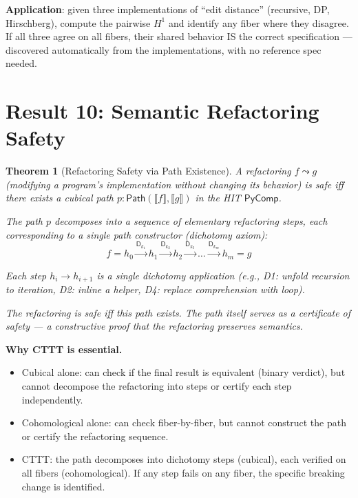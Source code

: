 \documentclass[11pt,a4paper]{report}
\theoremstyle{definition}
\theoremstyle{plain}
\newtheorem{theorem}[definition]{Theorem}
\newcommand{\den}[1]{\llbracket #1 \rrbracket}
\newcommand{\Path}{\mathsf{Path}}
\newcommand{\Hone}{H^1}
\begin{document}
\textbf{Application}: given three implementations of ``edit distance''
(recursive, DP, Hirschberg), compute the pairwise $\Hone$ and
identify any fiber where they disagree.  If all three agree on all
fibers, their shared behavior IS the correct specification ---
discovered automatically from the implementations, with no reference
spec needed.

\section{Result 10: Semantic Refactoring Safety}

\begin{theorem}[Refactoring Safety via Path Existence]
\label{thm:refactor}
A refactoring $f \leadsto g$ (modifying a program's implementation
without changing its behavior) is \emph{safe} iff there exists a
cubical path $p : \Path(\den{f}, \den{g})$ in the HIT
$\mathsf{PyComp}$.

The path $p$ decomposes into a sequence of elementary refactoring
steps, each corresponding to a single path constructor (dichotomy
axiom):
\[
  f = h_0 \xrightarrow{\mathsf{D}_{k_1}} h_1
    \xrightarrow{\mathsf{D}_{k_2}} h_2
    \xrightarrow{\mathsf{D}_{k_3}} \ldots
    \xrightarrow{\mathsf{D}_{k_m}} h_m = g
\]

Each step $h_i \to h_{i+1}$ is a single dichotomy application
(e.g., D1: unfold recursion to iteration, D2: inline a helper,
D4: replace comprehension with loop).

The refactoring is safe iff this path exists.  The path itself
serves as a \emph{certificate of safety} --- a constructive proof
that the refactoring preserves semantics.
\end{theorem}

\textbf{Why CTTT is essential.}
\begin{itemize}
  \item Cubical alone: can check if the final result is equivalent
    (binary verdict), but cannot decompose the refactoring into
    steps or certify each step independently.
  \item Cohomological alone: can check fiber-by-fiber, but cannot
    construct the path or certify the refactoring sequence.
  \item CTTT: the path decomposes into dichotomy steps (cubical),
    each verified on all fibers (cohomological).  If any step
    fails on any fiber, the specific breaking change is identified.
\end{itemize}
\end{document}
